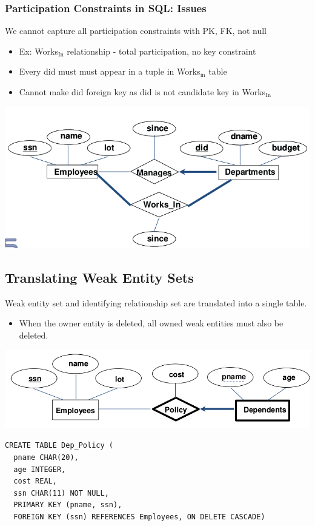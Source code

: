 \documentclass[11pt]{article}
\begin{document}
\subsubsection{Participation Constraints in SQL: Issues}
\label{sec:org235d8e2}
We cannot capture all participation constraints with PK, FK, not null
\begin{itemize}
\item Ex: Works\(_{\text{In}}\) relationship - total participation, no key constraint
\item Every did must must appear in a tuple in Works\(_{\text{in}}\) table
\item Cannot make did foreign key as did is not candidate key in Works\(_{\text{In}}\)
\end{itemize}
\begin{center}
\includegraphics[width=.9\linewidth]{files/Lecture 3/screenshot_2017-03-06_11-45-33.png}
\end{center}
\subsection{Translating Weak Entity Sets}
\label{sec:orga85aa64}
Weak entity set and identifying relationship set are translated into a single table.
\begin{itemize}
\item When the owner entity is deleted, all owned weak entities must also be
deleted.
\end{itemize}
\begin{center}
\includegraphics[width=.9\linewidth]{files/Lecture 3/screenshot_2017-03-06_11-51-38.png}
\end{center}
\begin{verbatim}
CREATE TABLE Dep_Policy (
  pname CHAR(20),
  age INTEGER,
  cost REAL,
  ssn CHAR(11) NOT NULL,
  PRIMARY KEY (pname, ssn),
  FOREIGN KEY (ssn) REFERENCES Employees, ON DELETE CASCADE)
\end{verbatim}
\end{document}
